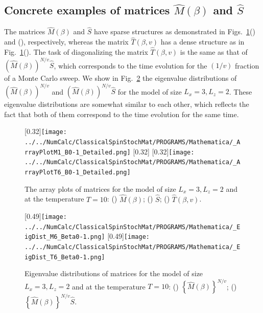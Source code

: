 \subsection{Concrete examples of matrices $\hat{M}(\beta)$ and $\hat{S}$}

The matrices $\hat{M}(\beta)$ and $\hat{S}$ have sparse structures as demonstrated in Figs.~\ref{fig:ArrayPlot}() and (), respectively, whereas the matrix $\hat{T}(\beta,v)$ has a dense structure as in Fig.~\ref{fig:ArrayPlot}(). The task of diagonalizing the matrix $\hat{T}(\beta,v)$ is the same as that of $\left(\hat{M}(\beta)\right)^{N/v}\hat{S}$, which corresponds to the time evolution for the $(1/v)$ fraction of a Monte Carlo sweep. We show in Fig.~\ref{fig:EigDist} the eigenvalue distributions of $\left(\hat{M}(\beta)\right)^{N/v}$ and $\left(\hat{M}(\beta)\right)^{N/v}\hat{S}$ for the model of size $L_{x}=3,L_{z}=2$. These eigenvalue distributions are somewhat similar to each other, which reflects the fact that both of them correspond to 
the time evolution for the same time.

\begin{figure}[htbp]
	\centering
	\subcaptionbox{\label{fig:ArrayPlotM}}[0.32\linewidth]{\texttt{[image: ../../NumCalc/ClassicalSpinStochMat/PROGRAMS/Mathematica/\_ArrayPlotM1\_B0-1\_Detailed.png]}}
	\subcaptionbox{\label{fig:ArrayPlotS}}[0.32\linewidth]{}
	\subcaptionbox{\label{fig:ArrayPlotT}}[0.32\linewidth]{\texttt{[image: ../../NumCalc/ClassicalSpinStochMat/PROGRAMS/Mathematica/\_ArrayPlotT6\_B0-1\_Detailed.png]}}
	
	\caption{The array plots of matrices for the model of size $L_{x}=3, L_{z}=2$ and at the temperature $T=10$: () $\hat{M}(\beta)$; () $\hat{S}$; () $\hat{T}(\beta,v)$.}
	\label{fig:ArrayPlot}
\end{figure}

\begin{figure}[htbp]
	\centering
	\subcaptionbox{\label{fig:EigDistM6}}[0.49\linewidth]{\texttt{[image: ../../NumCalc/ClassicalSpinStochMat/PROGRAMS/Mathematica/\_EigDist\_M6\_Beta0-1.png]}}
	\subcaptionbox{\label{fig:EigDistT6}}[0.49\linewidth]{\texttt{[image: ../../NumCalc/ClassicalSpinStochMat/PROGRAMS/Mathematica/\_EigDist\_T6\_Beta0-1.png]}}
	
	\caption{Eigenvalue distributions of matrices for the model of size $L_{x}=3, L_{z}=2$ and at the temperature $T=10$:  () $\left\{\hat{M}(\beta)\right\}^{N/v}$; () $\left\{\hat{M}(\beta)\right\}^{N/v}\hat{S}$.}
	\label{fig:EigDist}
\end{figure}

